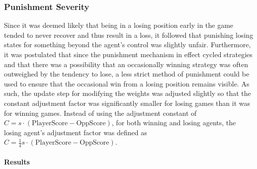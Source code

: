 
\subsubsection*{Punishment Severity}
\label{sec:findings-expts-punishments}

Since it was deemed likely that being in a losing position early in the game
tended to never recover and thus result in a loss,
it followed that punishing losing states for something beyond the agent's
control was slightly unfair.
%
Furthermore,
it was postulated that since the punishment mechanism in effect cycled
strategies
and that there was a possibility that an occasionally winning strategy was often
outweighed by the tendency to lose,
a less strict method of punishment could be used to ensure that the occasional
win from a losing position remains visible.
%
As such,
the update step for modifying the weights was adjusted slightly
so that the constant adjustment factor was significantly smaller for losing
games than it was for winning games.
%
Instead of using the adjustment constant of
$C = s \cdot (\text{PlayerScore} - \text{OppScore})$,
for both winning and losing agents,
the losing agent's adjustment factor was defined as
$C = \frac{1}{4} s \cdot (\text{PlayerScore} - \text{OppScore})$.

\paragraph*{Results}




